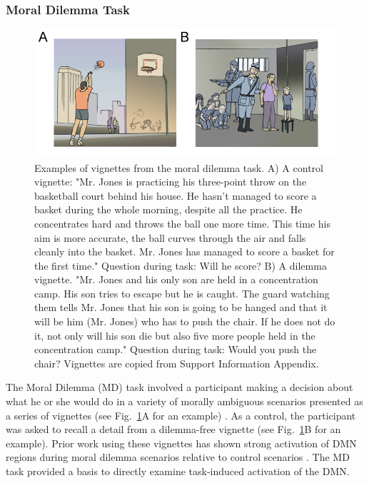 \subsubsection{Moral Dilemma Task}

\begin{figure}[h!]
   \centering
   \includegraphics[width=\textwidth]{md_vignettes.png}
   \caption{Examples of vignettes from the moral dilemma task. A) A control vignette: "Mr. Jones is practicing his three-point throw on the basketball court behind his house. He hasn’t managed to score a basket during the whole morning, despite all the practice. He concentrates hard and throws the ball one more time. This time his aim is more accurate, the ball curves through the air and falls cleanly into the basket. Mr. Jones has managed to score a basket for the first time." Question during task: Will he score? B) A dilemma vignette. "Mr. Jones and his only son are held in a concentration camp. His son tries to escape but he is caught. The guard watching them tells Mr. Jones that his son is going to be hanged and that it will be him (Mr. Jones) who has to push the chair. If he does not do it, not only will his son die but also five more people held in the concentration camp." Question during task: Would you push the chair? Vignettes are copied from \cite{Harrison2008} Support Information Appendix.}
   \label{fig:morald}
\end{figure}

The Moral Dilemma (MD) task involved a participant making a decision about what he or she would do in a variety of morally ambiguous scenarios presented as a series of vignettes (see Fig.~\ref{fig:morald}A for an example) \cite{Harrison2008}. As a control, the participant was asked to recall a detail from a dilemma-free vignette (see Fig.~\ref{fig:morald}B for an example). Prior work using these vignettes has shown strong activation of DMN regions during moral dilemma scenarios relative to control scenarios \cite{Harrison2008}. The MD task provided a basis to directly examine task-induced activation of the DMN.

